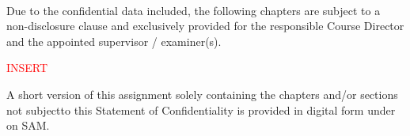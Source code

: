\thispagestyle{empty}
\begin{center}
	\type

	\vspace{1.5cm}

	\studentfirstname~\studentlastname

	\huge \textbf{\titleSperrvermerk}
\end{center}

\begin{spacing}{1.5}
	Due to the confidential data included, the following chapters are subject to a 
non-disclosure clause and exclusively provided for the responsible 
Course Director and the appointed supervisor / examiner(s).
\end{spacing}

 {\huge \textcolor{red}{INSERT}} %


\vspace{2cm} %

\begin{spacing}{1.5}
A short version of this assignment solely containing the chapters and/or sections 
not subjectto this Statement of Confidentiality is provided in digital form under
on SAM.
\end{spacing}
